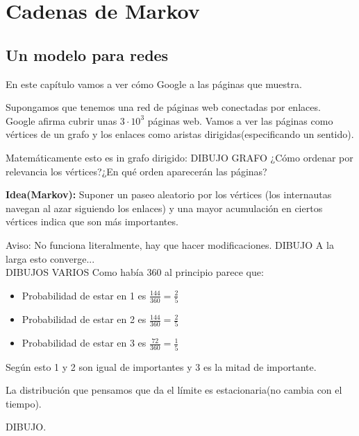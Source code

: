 \chapter{Cadenas de Markov}
\section{Un modelo para redes}
En este capítulo vamos a ver cómo Google a las páginas que muestra.

Supongamos que tenemos una red de páginas web conectadas por enlaces.\\
Google afirma cubrir unas $3\cdot 10^3$ páginas web.
Vamos a ver las páginas como vértices de un grafo y los enlaces como aristas dirigidas(especificando un sentido).

Matemáticamente esto es in grafo dirigido:
DIBUJO GRAFO
¿Cómo ordenar por relevancia los vértices?¿En qué orden aparecerán las páginas?


\textbf{Idea(Markov):} Suponer un paseo aleatorio por los vértices (los internautas navegan al azar siguiendo los enlaces) y una mayor acumulación en ciertos vértices indica que son más importantes.


Aviso: No funciona literalmente, hay que hacer modificaciones.
DIBUJO
A la larga esto converge...\\
DIBUJOS VARIOS
Como había 360 al principio parece que:


\begin{itemize}
	\item Probabilidad de estar en 1 es $\frac{144}{360} = \frac{2}{5}$
	\item Probabilidad de estar en 2 es $\frac{144}{360} = \frac{2}{5}$
	\item Probabilidad de estar en 3 es $\frac{72}{360} = \frac{1}{5}$
\end{itemize}
	Según esto 1 y 2 son igual de importantes y 3 es la mitad de importante.
	
	La distribución que pensamos que da el límite es estacionaria(no cambia con el tiempo).
	
	DIBUJO.

